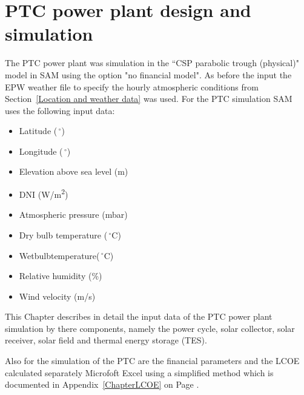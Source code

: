 \section{PTC power plant design  and simulation}
The PTC power plant was simulation in the “CSP parabolic trough (physical)" model in SAM using the option "no financial model". As before the input the EPW weather file to specify the hourly atmospheric conditions from Section~\ref{Location and weather data} was used. For the PTC simulation SAM uses the following input data:
\begin{itemize}
\item Latitude ($\,^{\circ}$)
\item Longitude ($\,^{\circ}$)
\item Elevation above sea level (m)
\item DNI (W/m\textsuperscript{2})
\item Atmospheric pressure (mbar)
\item Dry bulb temperature ($\,^{\circ}\mathrm{C}$)
\item Wetbulbtemperature($\,^{\circ}\mathrm{C}$)
\item Relative humidity (\%)
\item Wind velocity (m/s)
\end{itemize}
This Chapter describes in detail the input data of the PTC power plant simulation by there components, namely the  power cycle, solar collector, solar receiver, solar field and thermal energy storage (TES).

Also for the simulation of the PTC are the financial parameters and the LCOE calculated separately Microfoft Excel using a simplified method which is documented in Appendix~\ref{ChapterLCOE} on Page \pageref{ChapterLCOE}.
